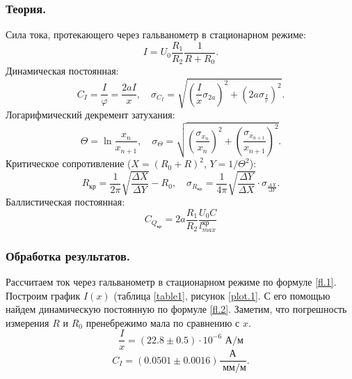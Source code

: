 \documentclass{article}
\begin{document}
   \subsubsection*{Теория.}
   Сила тока, протекающего через гальванометр в стационарном режиме:
   \begin{equation}
   \label{fl.1}
   I = U_0 \frac{R_1}{R_2}\frac{1}{R + R_0}.
   \end{equation}
   Динамическая постоянная:
   \begin{equation}
   \label{fl.2}
   C_I = \frac{I}{\varphi} = \frac{2aI}{x}, \quad \sigma_{C_I} = \sqrt{\left( \frac{I}{x}\sigma_{2a} \right)^2 + \left( 2a \sigma_{\frac{I}{x}} \right)^2}.
   \end{equation}
   Логарифмический декремент затухания:
   \begin{equation}
   \label{fl.3}
   \Theta = \ln \frac{x_n}{x_{n + 1}}, \quad \sigma_\Theta = \sqrt{\left(\frac{\sigma_{x_n}}{x_n}\right)^2 + \left( \frac{\sigma_{x_{n + 1}}}{x_{n + 1}} \right)^2}.
   \end{equation}
   Критическое сопротивление ($X = (R_0 + R)^2$, $Y = 1 / \Theta^2$):
   \begin{equation}
   \label{fl.4}
   R_{\text{кр}} = \frac{1}{2\pi}\sqrt{\frac{\Delta X}{\Delta Y}} - R_0, \quad \sigma_{R_\text{кр}} = \frac{1}{4\pi} \sqrt{\frac{\Delta Y}{\Delta X}} \cdot \sigma_{\frac{\Delta X}{\Delta Y}}.
   \end{equation}
   Баллистическая постоянная:
   \begin{equation}
   \label{fl.5}
   C_{Q_\text{кр}} = 2a \frac{R_1}{R_2} \frac{U_0 C}{l_{max}^\text{кр}}
   \end{equation}
   \subsubsection*{Обработка результатов.}
   Рассчитаем ток через гальванометр в стационарном режиме по формуле \eqref{fl.1}. Построим график $I(x)$ (таблица \ref{table1}, рисунок \ref{plot.1}. С его помощью найдем динамическую постоянную по формуле \eqref{fl.2}. Заметим, что погрешность измерения $R$ и $R_0$ пренебрежимо мала по сравнению с $x$.
   \[
      \frac{I}{x} = (22.8 \pm 0.5) \cdot 10^{-6} \text{ А}/\text{м}
   \]
   \[
      C_I = (0.0501 \pm 0.0016) \frac{\text{А}}{\text{ мм}/\text{м}}.
   \]
\end{document}
